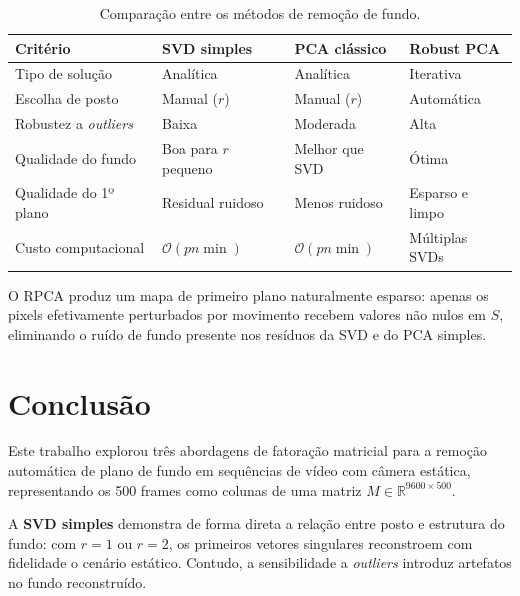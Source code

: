 \documentclass[12pt, a4paper]{article}
\begin{document}
\begin{table}[H]
  \centering
  \caption{Comparação entre os métodos de remoção de fundo.}
  \label{tab:comparacao}
  \begin{tabularx}{\linewidth}{lXXX}
    \toprule
    \textbf{Critério}      & \textbf{SVD simples}     & \textbf{PCA clássico}    & \textbf{Robust PCA} \\
    \midrule
    Tipo de solução        & Analítica                & Analítica                & Iterativa \\
    Escolha de posto       & Manual ($r$)             & Manual ($r$)             & Automática \\
    Robustez a \emph{outliers} & Baixa               & Moderada                 & Alta \\
    Qualidade do fundo     & Boa para $r$ pequeno     & Melhor que SVD           & Ótima \\
    Qualidade do 1º plano  & Residual ruidoso         & Menos ruidoso            & Esparso e limpo \\
    Custo computacional    & $\mathcal{O}(pn\min)$    & $\mathcal{O}(pn\min)$    & Múltiplas SVDs \\
    \bottomrule
  \end{tabularx}
\end{table}

\begin{destaque}
  O RPCA produz um mapa de primeiro plano naturalmente esparso: apenas os pixels
  efetivamente perturbados por movimento recebem valores não nulos em $S$,
  eliminando o ruído de fundo presente nos resíduos da SVD e do PCA simples.
\end{destaque}

\newpage

\section{Conclusão}
\label{sec:conclusao}

Este trabalho explorou três abordagens de fatoração matricial para a remoção
automática de plano de fundo em sequências de vídeo com câmera estática,
representando os 500 frames como colunas de uma matriz $M \in \mathbb{R}^{9600 \times 500}$.

A \textbf{SVD simples} demonstra de forma direta a relação entre posto e estrutura
do fundo: com $r = 1$ ou $r = 2$, os primeiros vetores singulares reconstroem com
fidelidade o cenário estático. Contudo, a sensibilidade a \emph{outliers} introduz
artefatos no fundo reconstruído.
\end{document}
